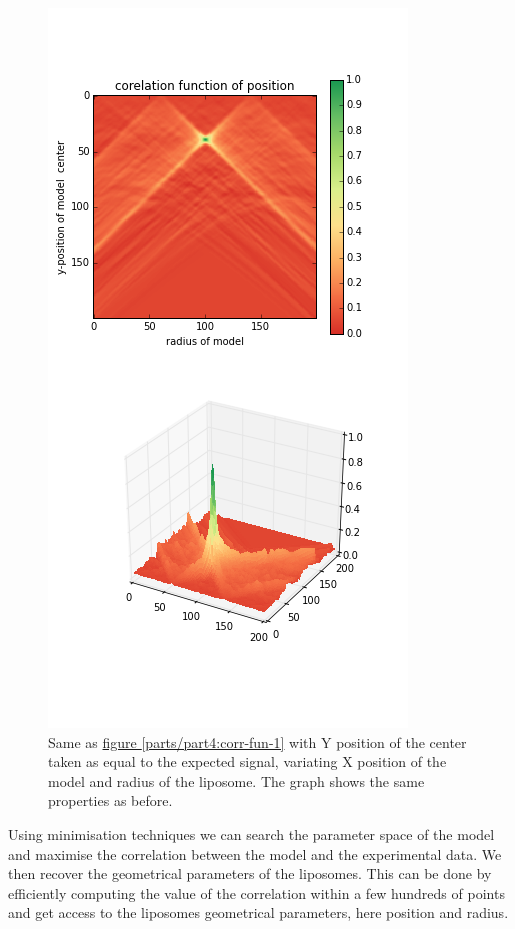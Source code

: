 \documentclass[A4paperpaper,11pt,english]{sphinxmanual}
\begin{document}
\begin{figure}[htbp]
\centering
\capstart

\includegraphics[width=0.600\linewidth]{c-R-_100-by-100-RC-40_0-noise-0_5-delta-4_0_.png}
\caption{Same as \hyperref[parts/part4:corr-fun-1]{figure  \ref*{parts/part4:corr-fun-1}}  with Y position of the center taken
as equal to the expected signal, variating X position of the model and
radius of the liposome. The graph shows the same properties as before.}\label{parts/part4:corr-fun-2}\end{figure}

Using minimisation techniques we can search the parameter space of the model and
maximise the correlation between the model and the experimental data. We then
recover the geometrical parameters of the liposomes. This can be done by
efficiently computing the value of the correlation within a few hundreds of
points and get access to the  liposomes geometrical parameters, here position
and radius.
\end{document}
